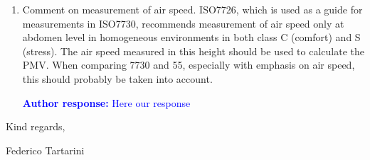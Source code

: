 \documentclass[a4paper, 10pt]{letter}
\newcommand{\response}[1]{\textcolor{blue}{\textbf{Author response:} #1}}
\begin{document}
\begin{letter}
\begin{enumerate}
            \response{Here our response}

            \item Comment on measurement of air speed.
            ISO7726, which is used as a guide for measurements in ISO7730, recommends measurement of air speed only at abdomen level in homogeneous environments in both class C (comfort) and S (stress).
            The air speed measured in this height should be used to calculate the PMV\@.
            When comparing 7730 and 55, especially with emphasis on air speed, this should probably be taken into account.

            \response{Here our response}

        \end{enumerate}

        Kind regards,

        \vspace*{5px}

        Federico Tartarini

    \end{letter}
\end{document}
